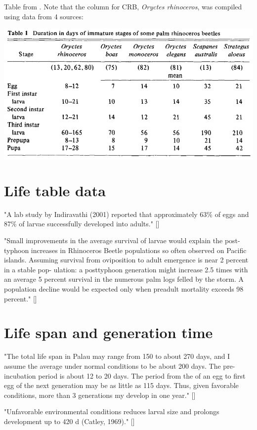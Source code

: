 \documentclass[12pt,letterpaper,english,bibliography=totocnumbered, abstract=on]{scrartcl}
\begin{document}
Table from \cite{bedford_biology_1980}. Note that the column for CRB, \textit{Oryctes rhinoceros}, was compiled using data from 4 sources:

\begin{center}
	\includegraphics[width=0.7\linewidth]{../crb-life-cycle}
\end{center}

\section{Life table data}

"A lab study by Indiravathi (2001) reported that approximately 63\% of eggs and 87\% of larvae successfully developed into adults." [\cite{pallipparambil_new_2015}]

"Small improvements in the average survival of
larvae would explain the post-typhoon increases in
Rhinoceros Beetle populations so often observed on
Pacific islands. Assuming survival from oviposition
to adult emergence is near 2 percent in a stable pop-
ulation: a posttyphoon generation might increase
2.5 times with an average 5 percent survival in
the numerous palm logs felled by the storm. A
population decline would be expected only when
preadult mortality exceeds 98 percent." [\cite{hinckley_ecology_1973}]

\section{Life span and generation time}

"The total life span in Palau may range from 150 to about 270 days, and I assume the average under normal conditions to be about 200 days. The pre-incubation period is about 12 to 20 days. The period from the of an egg to first egg of the next generation may be as little as 115 days. Thus, given favorable conditions, more than 3 generations my develop in one year." [\cite{gressitt_coconut_1953}]

"Unfavorable environmental conditions reduces larval size and prolongs
development up to 420 d (Catley, 1969)." [\cite{pallipparambil_new_2015}]
\end{document}
